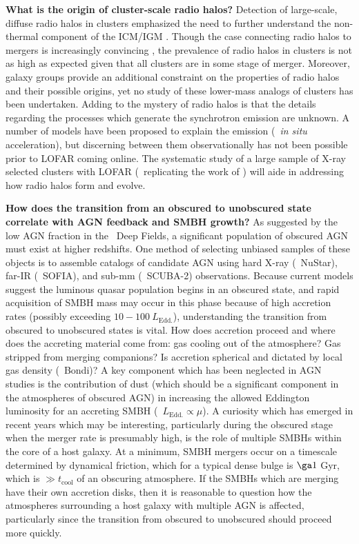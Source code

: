 \documentclass[12pt]{article}
\begin{document}
{\bf{What is the origin of cluster-scale radio halos?}} Detection of
large-scale, diffuse radio halos in clusters emphasized the need to
further understand the non-thermal component of the ICM/IGM
\cite[\eg][]{2009ApJ...704L..54G, 2009A&A...507.1257G}. Though the
case connecting radio halos to mergers is increasingly convincing
\cite{2009A&A...507..661B}, the prevalence of radio halos in clusters
is not as high as expected given that all clusters are in some stage
of merger. Moreover, galaxy groups provide an additional constraint on
the properties of radio halos and their possible origins, yet no study
of these lower-mass analogs of clusters has been undertaken. Adding to
the mystery of radio halos is that the details regarding the processes
which generate the synchrotron emission are unknown. A number of
models have been proposed to explain the emission (\eg\ {\textit{in
    situ}} acceleration), but discerning between them observationally
has not been possible prior to LOFAR coming online. The systematic
study of a large sample of X-ray selected clusters with LOFAR
(\eg\ replicating the work of \cite{2007A&A...463..937V,
  2008A&A...484..327V}) will aide in addressing how radio halos form
and evolve.

{\bf{How does the transition from an obscured to unobscured state
correlate with AGN feedback and SMBH growth?}} As suggested by the low
AGN fraction in the \chandra\ Deep Fields, a significant population of
obscured AGN must exist at higher redshifts. One method of selecting
unbiased samples of these objects is to assemble catalogs of candidate
AGN using hard X-ray (\ie\ NuStar), far-IR (\ie\ SOFIA), and sub-mm
(\ie\ SCUBA-2) observations. Because current models suggest the
luminous quasar population begins in an obscured state, and rapid
acquisition of SMBH mass may occur in this phase because of high
accretion rates (possibly exceeding $10-100~L_{\mathrm{Edd.}}$),
understanding the transition from obscured to unobscured states is
vital. How does accretion proceed and where does the accreting
material come from: gas cooling out of the atmosphere? Gas stripped
from merging companions? Is accretion spherical and dictated by local
gas density (\eg\ Bondi)?  A key component which has been neglected in
AGN studies is the contribution of dust (which should be a significant
component in the atmospheres of obscured AGN) in increasing the
allowed Eddington luminosity for an accreting SMBH (\ie\
$L_{\mathrm{Edd.}} \propto \mu$). A curiosity which has emerged in
recent years which may be interesting, particularly during the
obscured stage when the merger rate is presumably high, is the role of
multiple SMBHs within the core of a host galaxy. At a minimum, SMBH
mergers occur on a timescale determined by dynamical friction, which
for a typical dense bulge is $\ga 1$ Gyr, which is $\gg
t_{\mathrm{cool}}$ of an obscuring atmosphere. If the SMBHs which are
merging have their own accretion disks, then it is reasonable to
question how the atmospheres surrounding a host galaxy with multiple
AGN is affected, particularly since the transition from obscured to
unobscured should proceed more quickly.

\scriptsize


 
\end{document}
